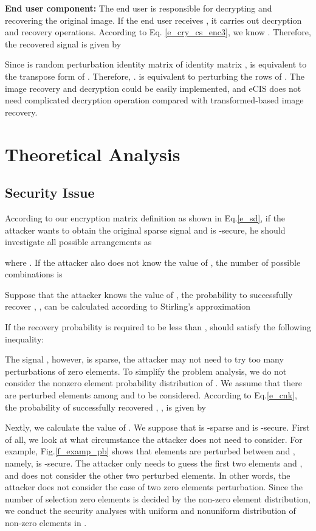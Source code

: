 \documentclass[conference]{IEEEtran}
\begin{document}
\textbf{End user component:}
The end user is responsible for decrypting and recovering the original image.  If the end user receives , it carries out decryption and recovery operations. According to Eq. \ref{e_cry_cs_enc3}, we know . Therefore, the recovered signal is given by

Since  is random perturbation identity matrix of identity matrix ,  is equivalent to the transpose form of . Therefore, .  is equivalent to perturbing the rows of . The image recovery and decryption could be easily implemented, and eCIS does not need  complicated decryption operation compared with transformed-based image recovery.

\section{Theoretical Analysis}
\subsection{Security Issue}\label{s_sa}
According to our encryption matrix definition as shown in Eq.\ref{e_sd}, if the attacker wants to obtain the original sparse signal and  is -secure, he should investigate all possible  arrangements as

where . If the attacker also does not know the value of , the number of possible combinations is

Suppose that the attacker knows the value of , the probability to successfully recover  , , can be calculated according to Stirling's approximation \cite{feller1968stirling}

If the recovery probability is required to be less than ,   should satisfy the following inequality:


The signal , however,  is sparse, the attacker may not need to try too many perturbations of zero elements.
To simplify the problem analysis, we do not consider the nonzero element probability distribution of . We assume that there are  perturbed elements among  and  to be considered. According to Eq.\ref{e_cnk}, the probability of successfully recovered , , is given by
{\footnotesize
}

Nextly, we calculate the value of . We suppose that  is -sparse and  is -secure. First of all, we  look at what circumstance the attacker does not need to consider.  For example, Fig.\ref{f_examp_pb} shows that  elements are perturbed between  and , namely,  is -secure. The attacker only needs to guess the first two elements  and , and does not consider the other two perturbed  elements. In other words, the attacker does not consider the case of two zero elements perturbation. Since the number of selection zero elements is decided by the non-zero element distribution, we conduct the security analyses with uniform and nonuniform distribution of non-zero elements in .
\end{document}
